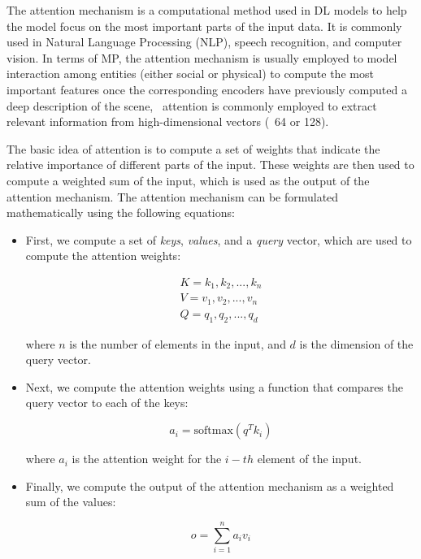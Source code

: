 The attention mechanism \cite{vaswani2017attention} is a computational method used in \ac{DL} models to help the model focus on the most important parts of the input data. It is commonly used in Natural Language Processing (NLP), speech recognition, and computer vision. In terms of \ac{MP}, the attention mechanism is usually employed to model interaction among entities (either social or physical) to compute the most important features once the corresponding encoders have previously computed a deep description of the scene, \ie \, attention is commonly employed to extract relevant information from high-dimensional vectors (\eg \ 64 or 128).

The basic idea of attention is to compute a set of weights that indicate the relative importance of different parts of the input. These weights are then used to compute a weighted sum of the input, which is used as the output of the attention mechanism. The attention mechanism can be formulated mathematically using the following equations:

\begin{itemize}
	\item First, we compute a set of \textit{keys}, \textit{values}, and a \textit{query} vector, which are used to compute the attention weights:
	
	\begin{equation}
		\begin{split}
			K = {k_1, k_2, ..., k_n} \\
			V = {v_1, v_2, ..., v_n} \\
			Q = {q_1, q_2, ..., q_d}
		\end{split}
	\end{equation}

	where $n$ is the number of elements in the input, and $d$ is the dimension of the query vector.
	
	\item Next, we compute the attention weights using a function that compares the query vector to each of the keys:
	
	\begin{equation}
		a_i = \text{softmax}(q^T k_i)
	\end{equation}
	
	where $a_i$ is the attention weight for the $i-th$ element of the input. 
	
	\item Finally, we compute the output of the attention mechanism as a weighted sum of the values:
	
	\begin{equation}
		o = \sum_{i=1}^{n} a_i v_i
	\end{equation}
\end{itemize}

